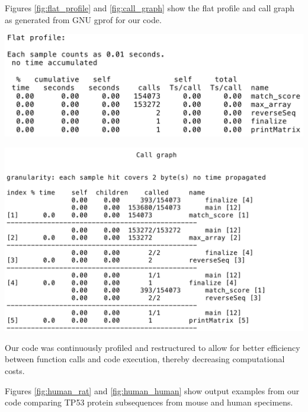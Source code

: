\documentclass{article}
\begin{document}
Figures \ref{fig:flat_profile} and \ref{fig:call_graph} show the flat profile
and call graph as generated from GNU gprof for our code.

\begin{center}
    \includegraphics[scale=0.4]{flat_profile.png}
    \label{fig:flat_profile}

    \includegraphics[scale=0.4]{call_graph.png}
    \label{fig:call_graph}
\end{center}

Our code was continuously profiled and restructured to allow for better 
efficiency between function calls and code execution, thereby decreasing
computational costs.

Figures \ref{fig:human_rat} and \ref{fig:human_human} show output examples from our code comparing
TP53 protein subsequences from mouse and human specimens.
\end{document}
